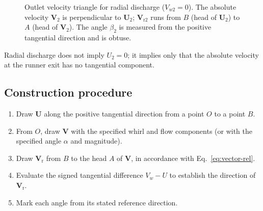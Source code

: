 \documentclass[11pt,a4paper]{article}
\numberwithin{equation}{section}
\newcommand{\vr}{\mathrm{r}}
\newcommand{\vvec}[1]{\bm{#1}}
\begin{document}
\begin{figure}[h!]
\centering
{}
\caption{Outlet velocity triangle for radial discharge ($V_{w2}=0$). The absolute velocity $\bm V_2$ is perpendicular to $\bm U_2$; $\bm V_{\mathrm r2}$ runs from $B$ (head of $\bm U_2$) to $A$ (head of $\bm V_2$). The angle $\beta_2$ is measured from the positive tangential direction and is obtuse.}
\label{fig:outlet}
\end{figure}

Radial discharge does not imply $U_2 = 0$; it implies only that the absolute velocity at the runner exit has no tangential component.

\subsection{Construction procedure}
\label{sec:construction}

\begin{enumerate}[nosep]
  \item Draw $\vvec{U}$ along the positive tangential direction from a point $O$ to a point $B$.
  \item From $O$, draw $\vvec{V}$ with the specified whirl and flow components (or with the specified angle $\alpha$ and magnitude).
  \item Draw $\vvec{V}_\vr$ from $B$ to the head $A$ of $\vvec{V}$, in accordance with Eq.~\eqref{eq:vector-rel}.
  \item Evaluate the signed tangential difference $V_w - U$ to establish the direction of $\vvec{V}_\vr$.
  \item Mark each angle from its stated reference direction.
\end{enumerate}

\end{document}
